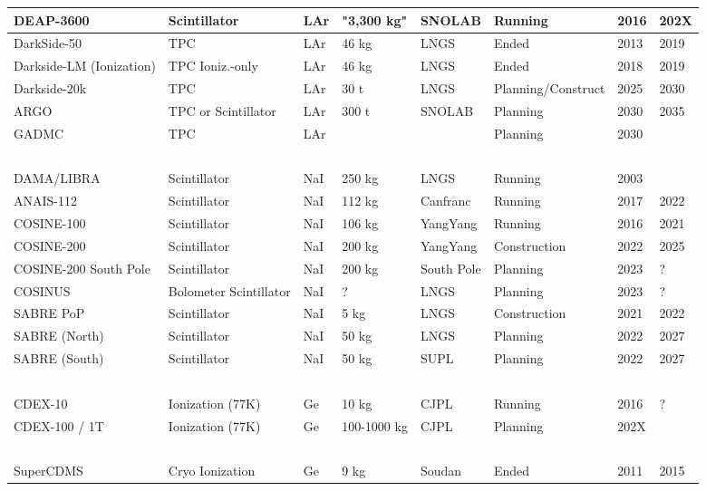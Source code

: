 \begin{table}[!ht]
\begin{tabular}{|l|l|l|l|l|l|l|l|}
        DEAP-3600 & Scintillator & LAr & "3,300 kg" & SNOLAB & Running & 2016 & 202X \\ \hline
        DarkSide-50 & TPC & LAr & 46 kg & LNGS & Ended & 2013 & 2019 \\ \hline
        Darkside-LM (Ionization) & TPC Ioniz.-only & LAr & 46 kg & LNGS & Ended & 2018 & 2019 \\ \hline
        Darkside-20k & TPC & LAr & 30 t & LNGS & Planning/Construct & 2025 & 2030 \\ \hline
        ARGO & TPC or Scintillator & LAr & 300 t & SNOLAB & Planning & 2030 & 2035 \\ \hline
        GADMC & TPC & LAr & ~ & ~ & Planning & 2030 & ~ \\ \hline
        ~ & ~ & ~ & ~ & ~ & ~ & ~ & ~ \\ \hline
        DAMA/LIBRA & Scintillator & NaI & 250 kg & LNGS & Running & 2003 & ~ \\ \hline
        ANAIS-112 & Scintillator & NaI & 112 kg & Canfranc & Running & 2017 & 2022 \\ \hline
        COSINE-100 & Scintillator & NaI & 106 kg & YangYang & Running & 2016 & 2021 \\ \hline
        COSINE-200 & Scintillator & NaI & 200 kg & YangYang & Construction & 2022 & 2025 \\ \hline
        COSINE-200 South Pole & Scintillator & NaI & 200 kg & South Pole & Planning & 2023 & ? \\ \hline
        COSINUS & Bolometer Scintillator & NaI & ? & LNGS & Planning & 2023 & ? \\ \hline
        SABRE PoP & Scintillator & NaI & 5 kg & LNGS & Construction & 2021 & 2022 \\ \hline
        SABRE (North) & Scintillator & NaI & 50 kg & LNGS & Planning & 2022 & 2027 \\ \hline
        SABRE (South) & Scintillator & NaI & 50 kg & SUPL & Planning & 2022 & 2027 \\ \hline
        ~ & ~ & ~ & ~ & ~ & ~ & ~ & ~ \\ \hline
        CDEX-10 & Ionization (77K) & Ge & 10 kg & CJPL & Running & 2016 & ? \\ \hline
        CDEX-100 / 1T & Ionization (77K) & Ge & 100-1000 kg & CJPL & Planning & 202X & ~ \\ \hline
        ~ & ~ & ~ & ~ & ~ & ~ & ~ & ~ \\ \hline
        SuperCDMS & Cryo Ionization & Ge & 9 kg & Soudan & Ended & 2011 & 2015 \\ \hline

\end{tabular}
\end{table}

